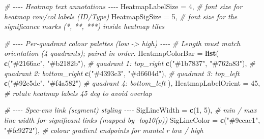 \documentclass[
]{book}
\newenvironment{Shaded}{\begin{snugshade}}{\end{snugshade}}
\newcommand{\AttributeTok}[1]{\textcolor[rgb]{0.13,0.29,0.53}{#1}}
\newcommand{\CommentTok}[1]{\textcolor[rgb]{0.56,0.35,0.01}{\textit{#1}}}
\newcommand{\DecValTok}[1]{\textcolor[rgb]{0.00,0.00,0.81}{#1}}
\newcommand{\FunctionTok}[1]{\textcolor[rgb]{0.13,0.29,0.53}{\textbf{#1}}}
\newcommand{\NormalTok}[1]{#1}
\newcommand{\StringTok}[1]{\textcolor[rgb]{0.31,0.60,0.02}{#1}}
\begin{document}
\begin{Shaded}
\begin{Highlighting}[]
  \CommentTok{\# {-}{-}{-}{-} Heatmap text annotations {-}{-}{-}{-}}
  \AttributeTok{HeatmapLabelSize  =} \DecValTok{4}\NormalTok{,                     }\CommentTok{\# font size for heatmap row/col labels (ID/Type)}
  \AttributeTok{HeatmapSigSize    =} \DecValTok{5}\NormalTok{,                     }\CommentTok{\# font size for the significance marks (*, **, ***) inside heatmap tiles}

  \CommentTok{\# {-}{-}{-}{-} Per{-}quadrant colour palettes (low {-}\textgreater{} high) {-}{-}{-}{-}}
  \CommentTok{\# Length must match \textasciigrave{}orientation\textasciigrave{} (4 quadrants); paired in order.}
  \AttributeTok{HeatmapColorBar =} \FunctionTok{list}\NormalTok{(}
    \FunctionTok{c}\NormalTok{(}\StringTok{"\#2166ac"}\NormalTok{, }\StringTok{"\#b2182b"}\NormalTok{),                 }\CommentTok{\# quadrant 1: top\_right}
    \FunctionTok{c}\NormalTok{(}\StringTok{"\#1b7837"}\NormalTok{, }\StringTok{"\#762a83"}\NormalTok{),                 }\CommentTok{\# quadrant 2: bottom\_right}
    \FunctionTok{c}\NormalTok{(}\StringTok{"\#4393c3"}\NormalTok{, }\StringTok{"\#d6604d"}\NormalTok{),                 }\CommentTok{\# quadrant 3: top\_left}
    \FunctionTok{c}\NormalTok{(}\StringTok{"\#92c5de"}\NormalTok{, }\StringTok{"\#f4a582"}\NormalTok{)                  }\CommentTok{\# quadrant 4: bottom\_left}
\NormalTok{  ),}
  \AttributeTok{HeatmapLabelOrient =} \DecValTok{45}\NormalTok{,                   }\CommentTok{\# rotate heatmap labels 45 deg to avoid overlap}

  \CommentTok{\# {-}{-}{-}{-} Spec{-}env link (segment) styling {-}{-}{-}{-}}
  \AttributeTok{SigLineWidth =} \FunctionTok{c}\NormalTok{(}\DecValTok{1}\NormalTok{, }\DecValTok{5}\NormalTok{),                    }\CommentTok{\# min / max line width for significant links (mapped by {-}log10(p))}
  \AttributeTok{SigLineColor =} \FunctionTok{c}\NormalTok{(}\StringTok{"\#9ecae1"}\NormalTok{, }\StringTok{"\#fc9272"}\NormalTok{),    }\CommentTok{\# colour gradient endpoints for mantel r low / high}


\end{Highlighting}
\end{Shaded}
\end{document}
